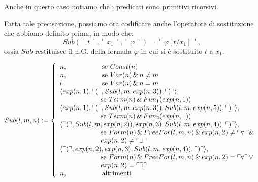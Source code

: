 Anche in questo caso notiamo che i predicati sono primitivi ricorsivi.

Fatta tale precisazione, possiamo ora codificare anche l'operatore di sostituzione che abbiamo definito prima, in modo che:
$$
Sub(\ulcorner t \urcorner, \ulcorner x_1 \urcorner, \ulcorner \varphi \urcorner) = \ulcorner \varphi[t/x_1] \urcorner,
$$
ossia $Sub$ restituisce il n.G. della formula $\varphi$ in cui si \`e sostituito $t$ a $x_1.$

{\tiny
\begin{displaymath}
Sub(l,m,n):= \left\{ { \begin{array}{l}
n, \hspace{1.8cm} \text{se $Const(n)$}\\
n, \hspace{1.8cm}\text {se $Var(n) \,\&\, n\ne m$} \\
l, \hspace{1.9cm}\text {se $Var(n) \,\&\, n= m$} \\
\langle exp(n,1), \ulcorner ( \urcorner, Sub(l,m,exp(n,3)), \ulcorner ) \urcorner \rangle,\\
\hspace{2.1cm}  \text{se $Term(n) \,\&\, Fun_1(exp(n,1))$}\\
\langle exp(n,1), \ulcorner ( \urcorner, Sub(l,m,exp(n,3)), Sub(l,m,exp(n,5)),\ulcorner ) \urcorner \rangle,\\
\hspace{2.1cm}  \text{se $Term(n) \,\&\, Fun_2(exp(n,1))$}\\
\langle \ulcorner ( \urcorner, Sub(l,m,exp(n,2)), exp(n,3), Sub(l,m,exp(n,4)),\ulcorner ) \urcorner \rangle,\\
\hspace{2.1cm}  \text{se $Form(n) \,\&\, FreeFor(l,m,n) \,\&\, exp(n,2)\ne \ulcorner \forall\urcorner \,\&\,$}\\
\hspace{2.1cm} \text{$exp(n,2)\ne \ulcorner \exists \urcorner$}\\
\langle \ulcorner ( \urcorner, exp(n,2), exp(n,3), Sub(l,m,exp(n,4)),\ulcorner ) \urcorner \rangle,\\
\hspace{2.1cm}  \text{se $Form(n) \,\&\, FreeFor(l,m,n) \,\&\, exp(n,2) = \ulcorner \forall\urcorner \,\vee\,$}\\
\hspace{2.1cm} 	\text{$exp(n,2) = \ulcorner \exists \urcorner$}\\
n, \hspace{1.8cm} \text{altrimenti}\\
\end{array}}\right.
\end{displaymath}}



